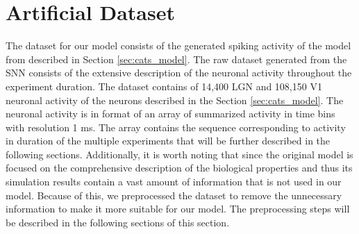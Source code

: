 \section{Artificial Dataset}
\label{sec:artificial_dataset}
The dataset for our model consists of the generated spiking activity of the model from \citet{antolik2024comprehensive} described in Section \ref{sec:cats_model}. The raw dataset generated from the SNN consists of the extensive description of the neuronal activity throughout the experiment duration. The dataset contains of 14,400 LGN and 108,150 V1 neuronal activity of the neurons described in the Section \ref{sec:cats_model}. The neuronal activity is in format of an array of summarized activity in time bins with resolution 1 ms. The array contains the sequence corresponding to activity in duration of the multiple experiments that will be further described in the following sections. Additionally, it is worth noting that since the original model is focused on the comprehensive description of the biological properties and thus its simulation results contain a vast amount of information that is not used in our model. Because of this, we preprocessed the dataset to remove the unnecessary information to make it more suitable for our model. The preprocessing steps will be described in the following sections of this section.


